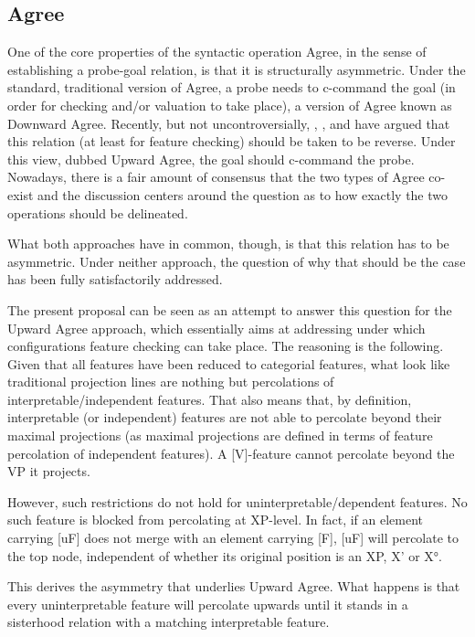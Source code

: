 \documentclass[output=paper
,modfonts
,nonflat]{langsci/langscibook}
\begin{document}
\subsection{Agree}
One of the core properties of the syntactic operation Agree, in the sense of establishing a probe-goal relation, is that it is structurally asymmetric. Under the standard, traditional version of Agree, a probe needs to c-command the goal (in order for checking and/or valuation to take place), a version of Agree known as Downward Agree. Recently, but not uncontroversially, \citet{Wurmbrand2012a, Wurmbrand2012}, \citet{Zeijlstra2012}, and \citet{Bjorkman_ZeijlstraTA} have argued that this relation (at least for feature checking) should be taken to be reverse. Under this view, dubbed Upward Agree, the goal should c-command the probe. Nowadays, there is a fair amount of consensus that the two types of Agree co-exist and the discussion centers around the question as to how exactly the two operations should be delineated.

What both approaches have in common, though, is that this relation has to be asymmetric. Under neither approach, the question of why that should be the case has been fully satisfactorily addressed. 

The present proposal can be seen as an attempt to answer this question for the Upward Agree approach, which essentially aims at addressing under which configurations feature checking can take place. The reasoning is the following. Given that all features have been reduced to categorial features, what look like traditional projection lines are nothing but percolations of interpretable\slash independent features. That also means that, by definition, interpretable (or independent) features are not able to percolate beyond their maximal projections (as maximal projections are defined in terms of feature percolation of independent features). A [V]-feature cannot percolate beyond the VP it projects.

However, such restrictions do not hold for uninterpretable\slash dependent features. No such feature is blocked from percolating at XP-level. In fact, if an element carrying [uF] does not merge with an element carrying [F], [uF] will percolate to the top node, independent of whether its original position is an XP, X’ or X°. 

This derives the asymmetry that underlies Upward Agree. What happens is that every uninterpretable feature will percolate upwards until it stands in a sisterhood relation with a matching interpretable feature.
\end{document}

